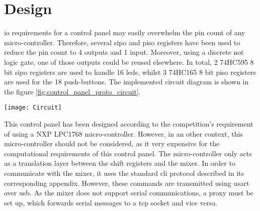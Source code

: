 \documentclass[../main.tex]{subfiles}
\begin{document}
\section{Design}
\Gls{io} requirements for a control panel may easily overwhelm the pin count of any micro-controller. Therefore, several \gls{sipo} and \gls{piso} registers have been used to reduce the pin count to 4 outputs and 1 input. Moreover, using a discrete not logic gate, one of those outputs could be reused elsewhere. In total, 2 74HC595 8 bit \gls{sipo} registers are used to handle 16 \glspl{led}, whilst 3 74HC165 8 bit \gls{piso} registers are used for the 18 push-buttons. The implemented circuit diagram is shown in the figure \ref{fig:control_panel_proto_circuit}.\newline

\begin{sidewaysfigure}[hbtp]
    \centering
    \texttt{[image: Circuit]}

    \label{fig:control_panel_proto_circuit}
    \caption{Digital circuit blueprints for the control panel prototype}
\end{sidewaysfigure}


This control panel has been designed according to the competition's requirement of using a NXP LPC1768 micro-controller. However, in an other context, this micro-controller should not be considered, as it very expensive for the computational requirements of this control panel. The micro-controller only acts as a translation layer between the shift registers and the mixer. In order to communicate with the mixer, it uses the standard \gls{cli} protocol described in its corresponding appendix. However, these commands are transmitted using \gls{usart} over \gls{usb}. As the mixer does not support serial communications, a proxy must be set up, which forwards serial messages to a \gls{tcp} socket and vice versa.
\end{document}
